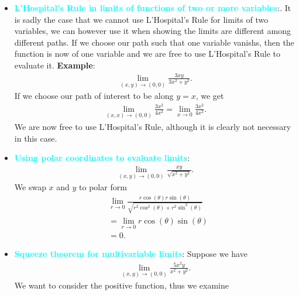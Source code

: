 \documentclass{report}
\begin{document}
\begin{itemize}
            \item \textbf{\textcolor{cyan}{ L'Hospital's Rule in limits of functions of two or more variables}}:. It is sadly the case that we cannot use L'Hospital's Rule for limits of two variables, we can however use it when showing the limits are different among different paths. If we choose our path such that one variable vanishs, then the function is now of one variable and we are free to use L'Hospital's Rule to evaluate it.
                \bigbreak \noindent 
                \textbf{Example}:
                \begin{align*}
                    \lim\limits_{(x,y) \to (0,0)}{\frac{3xy}{3x^{2} + y^{2}}}
                .\end{align*}
                If we choose our path of interest to be along $y=x$, we get 
                \begin{align*}
                    \lim\limits_{(x,x) \to (0,0)}{\frac{3x^{2}}{4x^{2}}} = \lim\limits_{x \to 0}{\frac{3x^{2}}{4x^{2}}}
                .\end{align*}
                We are now free to use L'Hospital's Rule, although it is clearly not necessary in this case.
            \item \textbf{\textcolor{cyan}{Using polar coordinates to evaluate limits}}:
                \begin{align*}
                    \lim\limits_{(x,y) \to (0,0)}{\frac{xy}{\sqrt{x^{2}+y^{2}}}}
                .\end{align*}
                We swap $x$ and $y$ to polar form
                \begin{align*}
                    &\lim\limits_{r \to 0}{\frac{r\cos{\left(\theta\right)}r\sin{\left(\theta\right)}}{\sqrt{r^{2}\cos^{2}{\left(\theta\right)}+r^{2}\sin^{2}{\left(\theta \right)}}}} \\
                    &=\lim\limits_{r \to 0}{r\cos{\left(\theta\right)}\sin{\left(\theta\right)}} \\
                    &=0
                .\end{align*}
            \item \textbf{\textcolor{cyan}{Squeeze theorem for multivariable limits}}: Suppose we have
                \begin{align*}
                    \lim\limits_{(x,y) \to (0,0)}{ \frac{5x^{2}y}{x^{2}+y^{2}}   }
                .\end{align*}
                We want to consider the positive function, thus we examine
                \begin{align*}

\end{align*}
\end{itemize}
\end{document}
